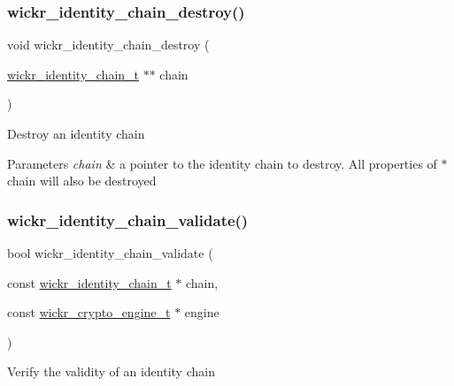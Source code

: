 \subsubsection{\texorpdfstring{wickr\+\_\+identity\+\_\+chain\+\_\+destroy()}{wickr\_identity\_chain\_destroy()}}
{\footnotesize\ttfamily void wickr\+\_\+identity\+\_\+chain\+\_\+destroy (\begin{DoxyParamCaption}\item[{\hyperlink{structwickr__identity__chain}{wickr\+\_\+identity\+\_\+chain\+\_\+t} $\ast$$\ast$}]{chain }\end{DoxyParamCaption})}

Destroy an identity chain


\begin{DoxyParams}{Parameters}
{\em chain} & a pointer to the identity chain to destroy. All properties of \textquotesingle{}$\ast$chain\textquotesingle{} will also be destroyed \\
\hline
\end{DoxyParams}
\mbox{\label{group__wickr__identity_ga12f5b33c4947b6a2ca3df3bdaacafa10}} 
\subsubsection{\texorpdfstring{wickr\+\_\+identity\+\_\+chain\+\_\+validate()}{wickr\_identity\_chain\_validate()}}
{\footnotesize\ttfamily bool wickr\+\_\+identity\+\_\+chain\+\_\+validate (\begin{DoxyParamCaption}\item[{const \hyperlink{structwickr__identity__chain}{wickr\+\_\+identity\+\_\+chain\+\_\+t} $\ast$}]{chain,  }\item[{const \hyperlink{structwickr__crypto__engine}{wickr\+\_\+crypto\+\_\+engine\+\_\+t} $\ast$}]{engine }\end{DoxyParamCaption})}

Verify the validity of an identity chain


